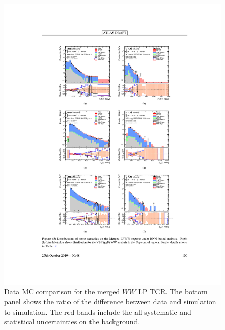 \begin{figure}[h!]
  \centering
  \includegraphics[width=\hsize , height=\textheight , keepaspectratio]{figures/Analysis/datamc/merged_lp_ww_tcr.pdf}
      \caption{Data MC comparison for the merged $WW$ LP TCR. The bottom panel shows the ratio of the difference between data and simulation to simulation. The red bands include the all systematic and statistical uncertainties on the background. } 
  \label{fig:merged_lp_ww_TCR_datamc}
\end{figure} 
\FloatBarrier


